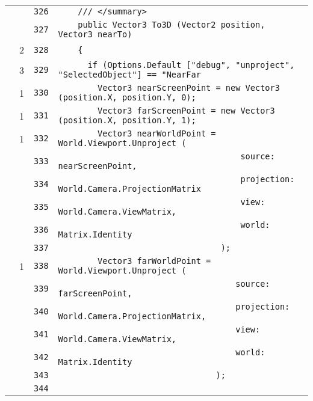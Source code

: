 \documentclass[a4paper,10pt]{article}
\begin{document}
\begin{longtable}[l]{lrrl}
\cellcolor{gray} &  & \verb~326~ & \verb~    /// </summary>~\\
\cellcolor{gray} &  & \verb~327~ & \verb~    public Vector3 To3D (Vector2 position, Vector3 nearTo)~\\
\cellcolor{green} & 2 & \verb~328~ & \verb~    {~\\
\cellcolor{green} & 3 & \verb~329~ & \verb~      if (Options.Default ["debug", "unproject", "SelectedObject"] == "NearFar~\\
\cellcolor{green} & 1 & \verb~330~ & \verb~        Vector3 nearScreenPoint = new Vector3 (position.X, position.Y, 0);~\\
\cellcolor{green} & 1 & \verb~331~ & \verb~        Vector3 farScreenPoint = new Vector3 (position.X, position.Y, 1);~\\
\cellcolor{green} & 1 & \verb~332~ & \verb~        Vector3 nearWorldPoint = World.Viewport.Unproject (~\\
\cellcolor{gray} &  & \verb~333~ & \verb~                                     source: nearScreenPoint,~\\
\cellcolor{gray} &  & \verb~334~ & \verb~                                     projection: World.Camera.ProjectionMatrix~\\
\cellcolor{gray} &  & \verb~335~ & \verb~                                     view: World.Camera.ViewMatrix,~\\
\cellcolor{gray} &  & \verb~336~ & \verb~                                     world: Matrix.Identity~\\
\cellcolor{gray} &  & \verb~337~ & \verb~                                 );~\\
\cellcolor{green} & 1 & \verb~338~ & \verb~        Vector3 farWorldPoint = World.Viewport.Unproject (~\\
\cellcolor{gray} &  & \verb~339~ & \verb~                                    source: farScreenPoint,~\\
\cellcolor{gray} &  & \verb~340~ & \verb~                                    projection: World.Camera.ProjectionMatrix,~\\
\cellcolor{gray} &  & \verb~341~ & \verb~                                    view: World.Camera.ViewMatrix,~\\
\cellcolor{gray} &  & \verb~342~ & \verb~                                    world: Matrix.Identity~\\
\cellcolor{gray} &  & \verb~343~ & \verb~                                );~\\
\cellcolor{gray} &  & \verb~344~ & \verb~~\\

\end{longtable}
\end{document}

